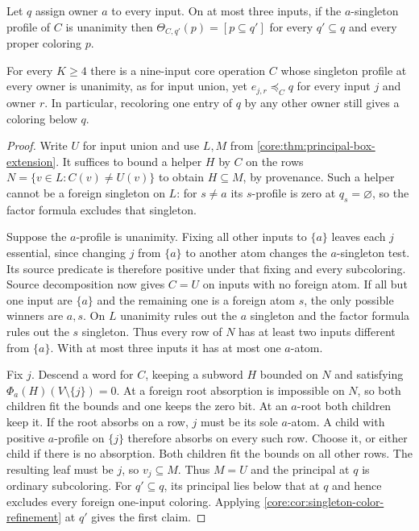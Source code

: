 \begin{theorem}
\label{core:thm:unanimity-activation-obstruction}
Let $q$ assign owner $a$ to every input. On at most three inputs, if
the $a$-singleton profile of $C$ is unanimity then
$\Theta_{C,q'}(p)=[p\subseteq q']$ for every $q'\subseteq q$ and
every proper coloring $p$.

For every $K\geq4$ there is a nine-input core operation $C$ whose
singleton profile at every owner is unanimity, as for input union,
yet $e_{j,r}\preceq_C q$ for every input $j$ and owner $r$.
In particular, recoloring one entry of $q$ by any other owner still
gives a coloring below $q$.
\end{theorem}
\begin{proof}
Write $U$ for input union and use $L,M$ from
\cref{core:thm:principal-box-extension}. It suffices to bound a helper
$H$ by $C$ on the rows $N=\{v\in L:C(v)\ne U(v)\}$ to obtain
$H\subseteq M$, by provenance. Such a helper cannot be a foreign
singleton on $L$: for $s\ne a$ its $s$-profile is zero at
$q_s=\varnothing$, so the factor formula excludes that singleton.

Suppose the $a$-profile is unanimity. Fixing all other inputs to
$\{a\}$ leaves each $j$ essential, since changing $j$ from $\{a\}$
to another atom changes the $a$-singleton test. Its source predicate
is therefore positive under that fixing and every subcoloring.
Source decomposition now gives $C=U$ on inputs with no foreign atom.
If all but one input are $\{a\}$ and the remaining one is a foreign
atom $s$, the only possible winners are $a,s$. On $L$ unanimity rules
out the $a$ singleton and the factor formula rules out the $s$
singleton. Thus every row of $N$ has at least two inputs different
from $\{a\}$. With at most three inputs it has at most one $a$-atom.

Fix $j$. Descend a word for $C$, keeping a subword $H$ bounded on
$N$ and satisfying $\Phi_a(H)(V\setminus\{j\})=0$. At a foreign
root absorption is impossible on $N$, so both children fit the bounds
and one keeps the zero bit. At an $a$-root both children keep it. If
the root absorbs on a row, $j$ must be its sole $a$-atom. A child with
positive $a$-profile on $\{j\}$ therefore absorbs on every such row.
Choose it, or either child if there is no absorption. Both children
fit the bounds on all other rows. The resulting leaf must be $j$, so
$v_j\subseteq M$. Thus $M=U$ and the principal at $q$ is ordinary
subcoloring. For $q'\subseteq q$, its principal lies below that at
$q$ and hence excludes every foreign one-input coloring. Applying
\cref{core:cor:singleton-color-refinement} at $q'$ gives the first claim.


\end{proof}
